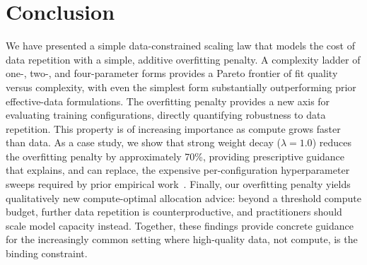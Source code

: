 \section{Conclusion}

We have presented a simple data-constrained scaling law that models the cost of data repetition with a simple, additive overfitting penalty. A complexity ladder of one-, two-, and four-parameter forms provides a Pareto frontier of fit quality versus complexity, with even the simplest form substantially outperforming prior effective-data formulations.
The overfitting penalty provides a new axis for evaluating training configurations, directly quantifying robustness to data repetition. This property is of increasing importance as compute grows faster than data. As a case study, we show that strong weight decay ($\lambda=1.0$) reduces the overfitting penalty by approximately 70\%, providing prescriptive guidance that explains, and can replace, the expensive per-configuration hyperparameter sweeps required by prior empirical work~\citep{kim2026pretraining}.
Finally, our overfitting penalty yields qualitatively new compute-optimal allocation advice: beyond a threshold compute budget, further data repetition is counterproductive, and practitioners should scale model capacity instead. Together, these findings provide concrete guidance for the increasingly common setting where high-quality data, not compute, is the binding constraint.

